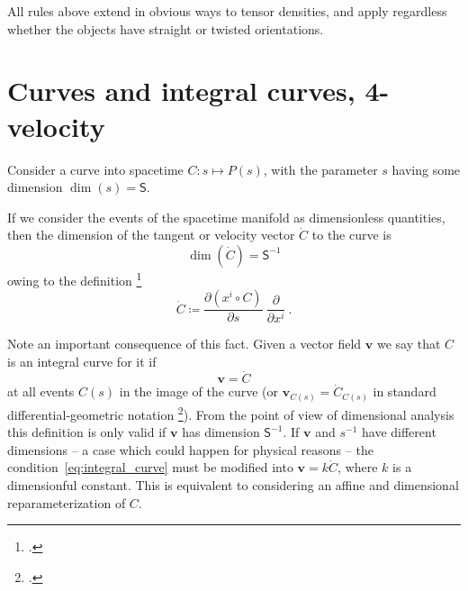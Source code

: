 \documentclass[\ifafour a4paper,12pt,\else a5paper,10pt,\fi%
onecolumn,oneside,article,%
british%
]{memoir}
\newcommand*{\defquote}[1]{`#1'}
\theoremstyle{remark}
\theoremstyle{innote}
\newcommand*{\citep}{\footcites}
\newcommand*{\de}{\partialup}%
\newcommand*{\defd}{\coloneqq}
\renewcommand*{\|}[1][]{\nonscript\,#1\vert\nonscript\;\mathopen{}}
\newcommand*{\sect}{\S}%
\newcommand*{\chap}{ch.}%
\newcommand*{\Ss}{\textsf{S}}
\newcommand*{\yv}{\bm{v}}
\newcommand*{\dex}[1][i]{\frac{\de}{\de x^{#1}}}
\newcommand*{\yC}{\dot{C}}
\begin{document}
\medskip


All rules above extend in obvious ways to tensor densities, and apply
regardless whether the objects have straight or twisted orientations.



\section{Curves and integral curves, 4-velocity}
\label{sec:curves}


Consider a curve into spacetime $C\colon s \mapsto P(s)$, with the
parameter $s$ having some dimension $\dim(s)=\Ss$.


If we consider the events of the spacetime manifold as dimensionless
quantities, then the dimension of the tangent or velocity vector $\yC$
to the curve is
\begin{equation}
  \label{eq:dim_velocity}
  \dim(\yC) = \Ss^{-1} 
\end{equation}
owing to the definition
\citep[\sect~III.B.1]{choquetbruhatetal1977_r1996}[\sect~IV.(1.9)]{boothby1975_r2003}
\begin{equation}
  \label{eq:def_tangent_curve}
\yC \defd \frac{\de (x^{i} \circ C)}{\de s}\ \dex \ .
\end{equation}

Note an important consequence of this fact. Given a vector field $\yv$ we
say that $C$ is an integral curve for it if
\begin{equation}
  \yv = \yC
  \label{eq:integral_curve}
\end{equation}
at all events $C(s)$ in the image of the curve (or
$\yv_{C(s)} = \yC_{C(s)}$ in standard differential-geometric notation
\citep[\sect~III.B.1]{choquetbruhatetal1977_r1996}). From the point of view
of dimensional analysis this definition is only valid if $\yv$ has
dimension $\Ss^{-1}$. If $\yv$ and $s^{-1}$ have different dimensions -- a
case which could happen for physical reasons -- the
condition~\eqref{eq:integral_curve} must be modified into $\yv = k\yC$,
where $k$ is a dimensionful constant. This is equivalent to considering an
affine and dimensional reparameterization of $C$.
\end{document}
